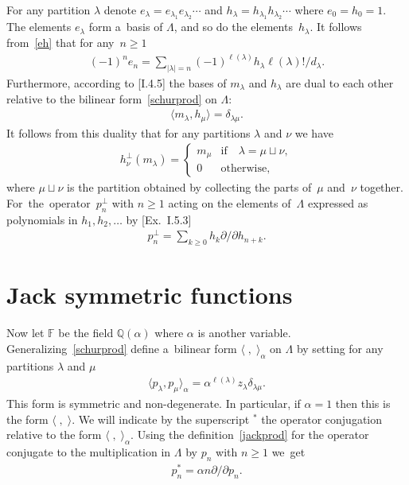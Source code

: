\documentclass[11pt]{article}
\numberwithin{equation}{section}
\renewcommand\ge{\geqslant}
\begin{document}
For any partition $\lambda$ denote $ e_\lambda=e_{\lambda_1}e_{\lambda_2}\cdots $ and $
h_\lambda=h_{\lambda_1}h_{\lambda_2}\cdots $ where $e_0=h_0=1$.
The elements $e_\lambda$ form a~basis of $\Lambda$, and so do the elements~$h_\lambda$.
It follows from~\eqref{eh} that for any~$n\ge1$
\begin{gather}
\label{ehnu}
(-1)^ne_n=\sum_{|\lambda|=n}(-1)^{\ell(\lambda)}h_\lambda\ell(\lambda)
!/d_\lambda.
\end{gather}
Furthermore, according to [I.4.5] the bases of $m_\lambda$ and $h_\lambda$ are dual to each other relative
to the bilinear form~\eqref{schurprod} on $\Lambda$:
\begin{gather}
\label{mh}
\langle m_\lambda,h_\mu\rangle=\delta_{\lambda\mu}.
\end{gather}
It follows from this duality that for any partitions $\lambda$ and $\nu$ we have
\begin{gather}
\label{hperp}
h_\nu^\perp(m_\lambda)=
\begin{cases}
m_\mu&\text{if}\quad\lambda=\mu\sqcup\nu,
\\
0&\text{otherwise,}
\end{cases}
\end{gather}
where $\mu\sqcup\nu$ is the partition obtained by collecting the parts of~$\mu$ and~$\nu$ together.
For~the~opera\-tor~$p_n^{\perp}$ with $n\ge1$ acting on the elements of~$\Lambda$ expressed as
polynomials in $h_1, h_2, \ldots$ by [Ex.~I.5.3]
\begin{gather}
\label{pperp}
p_n^{\perp}=\sum_{k\ge0}h_k\partial /\partial h_{n+k}.
\end{gather}

\section{Jack symmetric functions}\label{Section5}

Now let $\mathbb F$ be the f\/ield $\mathbb Q(\alpha)$ where $\alpha$ is another variable.
Generalizing~\eqref{schurprod} def\/ine a~bilinear form $\langle\;,\;\rangle_\alpha$ on $\Lambda$
by setting for any partitions $\lambda$ and $\mu$
\begin{gather}
\label{jackprod}
\langle p_\lambda,p_\mu\rangle_\alpha=\alpha^{\ell(\lambda)}
z_\lambda\delta_{\lambda\mu}.
\end{gather}
This form is symmetric and non-degenerate.
In particular, if $\alpha=1$ then this is the form $\langle\;,\; \rangle$.
We will indicate by the superscript ${}^\ast$ the operator conjugation relative to the form
$\langle\;,\;\rangle_\alpha$.
Using the def\/inition~\eqref{jackprod} for the operator conjugate to the multiplication in $\Lambda$ by
$p_n$ with $n\ge1$ we~get
\begin{gather}
\label{pnast}
p_n^{\ast}=\alpha n\partial /\partial p_n.
\end{gather}
\end{document}

